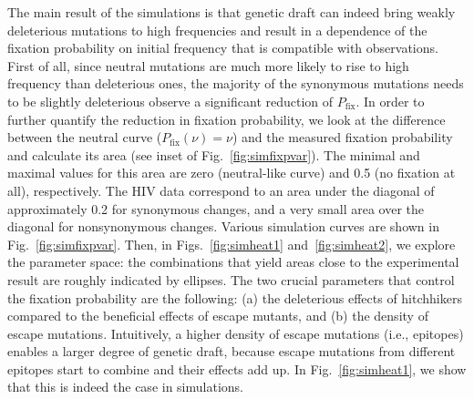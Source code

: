 \documentclass[rmp, twocolumn]{revtex4}
\newcommand{\FIG}[1]{Fig.~\ref{fig:#1}}
\newcommand{\FIGS}[2]{Figs.~\ref{fig:#1} and~\ref{fig:#2}}
\begin{document}
The main result of the simulations is that genetic draft can indeed bring weakly
deleterious mutations to high frequencies and result in a dependence of the
fixation probability on initial frequency that is compatible with observations.
First of all, since neutral mutations are much more likely to rise to high
frequency than deleterious ones, the majority of the synonymous mutations needs
to be slightly deleterious observe a significant reduction of $P_\text{fix}$.
In order to further quantify the reduction in fixation probability, we look at
the difference between the neutral curve ($P_\text{fix}(\nu) = \nu$) and the
measured fixation probability and calculate its area (see inset of
\FIG{simfixpvar}). The minimal and maximal values for this area are zero
(neutral-like curve) and 0.5 (no fixation at all), respectively. The HIV data
correspond to an area under the diagonal of approximately 0.2 for synonymous
changes, and a very small area over the diagonal for nonsynonymous changes.
Various simulation curves are shown in \FIG{simfixpvar}. Then, in
\FIGS{simheat1}{simheat2}, we explore the parameter space: the combinations that
yield areas close to the experimental result are roughly indicated by ellipses.
The two crucial parameters that control the fixation probability are the
following: (a) the deleterious effects of hitchhikers compared to the beneficial
effects of escape mutants, and (b) the density of escape mutations. Intuitively,
a higher density of escape mutations (i.e., epitopes) enables a larger degree of
genetic draft, because escape mutations from different epitopes start to combine
and their effects add up. In \FIG{simheat1}, we show that this is indeed the
case in simulations.
\end{document}
